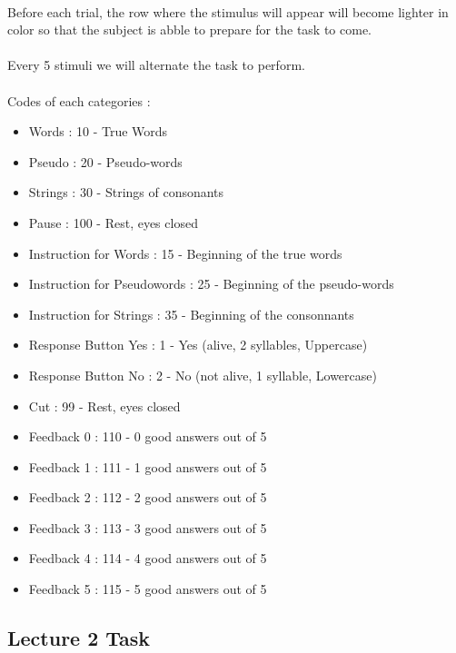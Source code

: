 \documentclass[a4paper]{article}
\begin{document}
\paragraph{} Before each trial, the row where the stimulus will appear will become lighter in color so that the subject is abble to prepare for the task to come.
\paragraph{} Every 5 stimuli we will alternate the task to perform.

\paragraph{}
Codes of each categories :

\begin{itemize}
\item Words : 10 - True Words
\item Pseudo : 20 - Pseudo-words
\item Strings : 30 - Strings of consonants
\item Pause : 100 - Rest, eyes closed
\item Instruction for Words : 15 - Beginning of the true words
\item Instruction for Pseudowords : 25 - Beginning of the pseudo-words
\item Instruction for Strings : 35 - Beginning of the consonnants
\item Response Button Yes : 1 - Yes (alive, 2 syllables, Uppercase)
\item Response Button No : 2 - No (not alive, 1 syllable, Lowercase)
\item Cut : 99 - Rest, eyes closed
\item Feedback 0 : 110 - 0 good answers out of 5
\item Feedback 1 : 111 - 1 good answers out of 5
\item Feedback 2 : 112 - 2 good answers out of 5
\item Feedback 3 : 113 - 3 good answers out of 5
\item Feedback 4 : 114 - 4 good answers out of 5
\item Feedback 5 : 115 - 5 good answers out of 5
\end{itemize}

\subsection{Lecture 2 Task} \label{localec2}   
\end{document}
